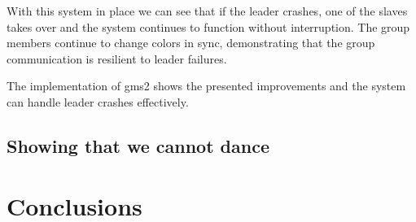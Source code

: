 \documentclass[a4paper, 11pt]{article}
\begin{document}
With this system in place we can see that if the leader crashes, one of the slaves takes over and the system continues to function without interruption. The group members continue to change colors in sync, demonstrating that the group communication is resilient to leader failures.

The implementation of gms2 shows the presented improvements and the system can handle leader crashes effectively.

\subsection{Showing that we cannot dance}

\section{Conclusions}
\end{document}
